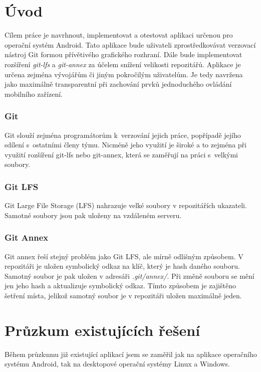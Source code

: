 \chapter{Úvod}
Cílem práce je navrhnout, implementovat a otestovat aplikaci určenou pro operační systém Android. Tato aplikace bude uživateli zprostředkovávat verzovací nástroj Git formou přívětivého grafického rozhraní. Dále bude implementovat rozšíření \emph{git-lfs} a \emph{git-annex} za účelem snížení velikosti repozitářů. Aplikace je určena zejména vývojářům či jiným pokročilým uživatelům. Je tedy navržena jako maximálně transparentní při zachování prvků jednoduchého ovládání mobilního zařízení.

\subsection {Git}
Git slouží zejména programátorům k verzování jejich práce, popřípadě jejího sdílení s ostatními členy týmu. Nicméně jeho využití je široké a to zejména při využití rozšíření git-lfs nebo git-annex, která se zaměřují na práci s velkými soubory.

\subsection{Git LFS}
Git Large File Storage (LFS) nahrazuje velké soubory v repozitářích ukazateli. Samotné soubory jsou pak uloženy na vzdáleném serveru.

\subsection{Git Annex}
Git annex řeší stejný problém jako Git LFS, ale mírně odlišným způsobem. V repozitáři je uložen symbolický odkaz na klíč, který je hash daného souboru. Samotný soubor je pak uložen v adresáři \emph{.git/annex/}. Při změně souboru se mění jen jeho hash a aktualizuje symbolický odkaz. Tímto způsobem je zajištěno šetření místa, jelikož samotný soubor je v repozitáři uložen maximálně jeden.

\chapter{Průzkum existujících řešení}
Během průzkumu již existující aplikací jsem se zaměřil jak na aplikace operačního systému Android, tak na desktopové operační systémy Linux a Windows.

